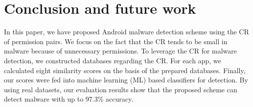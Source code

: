 \documentclass{ieeeaccess}
\begin{document}

\section{Conclusion and future work} \label{sec:conclusion}
In this paper, we have proposed Android malware detection scheme using the CR of permission pairs.  
We focus on the fact that the CR tends to be small in malware because of unnecessary permissions.
To leverage the CR for malware detection, we constructed databases regarding the CR.
For each app, we calculated eight similarity scores on the basis of the prepared databases.
Finally, our scores were fed into machine learning (ML) based classifiers for detection.
By using real datasets, our evaluation results show that the proposed scheme can detect malware with up to 97.3\% accuracy.
\end{document}
